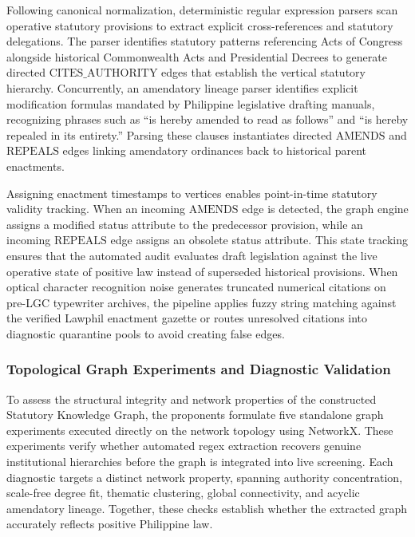         Following canonical normalization, deterministic regular expression parsers scan operative statutory provisions to extract explicit cross-references and statutory delegations. The parser identifies statutory patterns referencing Acts of Congress alongside historical Commonwealth Acts and Presidential Decrees to generate directed $\text{CITES\_AUTHORITY}$ edges that establish the vertical statutory hierarchy. Concurrently, an amendatory lineage parser identifies explicit modification formulas mandated by Philippine legislative drafting manuals, recognizing phrases such as ``is hereby amended to read as follows'' and ``is hereby repealed in its entirety.'' Parsing these clauses instantiates directed $\text{AMENDS}$ and $\text{REPEALS}$ edges linking amendatory ordinances back to historical parent enactments.

        Assigning enactment timestamps to vertices enables point-in-time statutory validity tracking. When an incoming $\text{AMENDS}$ edge is detected, the graph engine assigns a modified status attribute to the predecessor provision, while an incoming $\text{REPEALS}$ edge assigns an obsolete status attribute. This state tracking ensures that the automated audit evaluates draft legislation against the live operative state of positive law instead of superseded historical provisions. When optical character recognition noise generates truncated numerical citations on pre-LGC typewriter archives, the pipeline applies fuzzy string matching against the verified Lawphil enactment gazette or routes unresolved citations into diagnostic quarantine pools to avoid creating false edges.

        \subsubsection{Topological Graph Experiments and Diagnostic Validation}
        \label{sec:graph_experiments_validation}
        To assess the structural integrity and network properties of the constructed Statutory Knowledge Graph, the proponents formulate five standalone graph experiments executed directly on the network topology using NetworkX. These experiments verify whether automated regex extraction recovers genuine institutional hierarchies before the graph is integrated into live screening. Each diagnostic targets a distinct network property, spanning authority concentration, scale-free degree fit, thematic clustering, global connectivity, and acyclic amendatory lineage. Together, these checks establish whether the extracted graph accurately reflects positive Philippine law.

